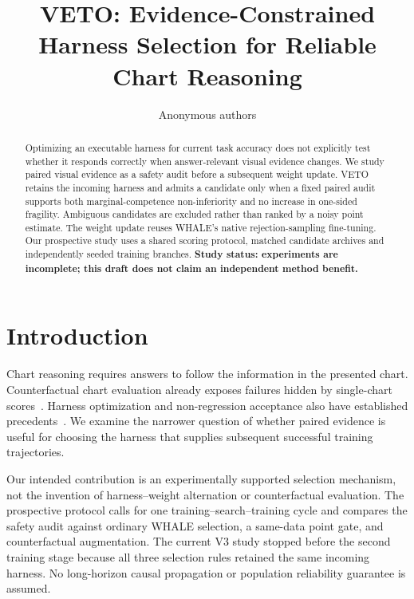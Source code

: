 \documentclass[10pt,twocolumn,letterpaper]{article}
\title{VETO: Evidence-Constrained Harness Selection for Reliable Chart Reasoning}
\author{Anonymous authors}
\begin{document}
\maketitle
\begin{abstract}
Optimizing an executable harness for current task accuracy does not explicitly
test whether it responds correctly when answer-relevant visual evidence changes.
We study paired visual evidence as a safety audit before a subsequent weight
update. VETO retains the incoming harness and admits a candidate only when a
fixed paired audit supports both marginal-competence non-inferiority and no
increase in one-sided fragility. Ambiguous candidates are excluded rather than
ranked by a noisy point estimate. The weight update reuses
WHALE's native rejection-sampling fine-tuning. Our prospective study uses a
shared scoring protocol, matched candidate archives and independently seeded
training branches. \textbf{Study status: experiments are incomplete; this draft
does not claim an independent method benefit.}
\end{abstract}

\section{Introduction}
Chart reasoning requires answers to follow the information in the presented
chart. Counterfactual chart evaluation already exposes failures hidden by
single-chart scores~\cite{chartographer}. Harness optimization and non-regression
acceptance also have established precedents~\cite{whale,autodesign}. We examine
the narrower question of whether paired evidence is useful for choosing the
harness that supplies subsequent successful training trajectories.

Our intended contribution is an experimentally supported selection mechanism,
not the invention of harness--weight alternation or counterfactual evaluation.
The prospective protocol calls for one training--search--training cycle and compares
the safety audit against ordinary WHALE selection, a same-data point gate, and
counterfactual augmentation. The current V3 study stopped before the second training
stage because all three selection rules retained the same incoming harness.
No long-horizon causal propagation or population reliability guarantee is assumed.
\end{document}
